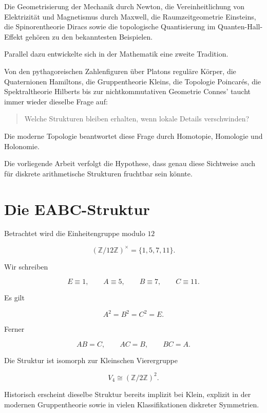 \documentclass[11pt,a4paper]{article}
\begin{document}
	Die Geometrisierung der Mechanik durch Newton,
	die Vereinheitlichung von Elektrizität und Magnetismus
	durch Maxwell,
	die Raumzeitgeometrie Einsteins,
	die Spinorentheorie Diracs
	sowie die topologische Quantisierung
	im Quanten-Hall-Effekt
	gehören zu den bekanntesten Beispielen.
	
	Parallel dazu entwickelte sich in der Mathematik
	eine zweite Tradition.
	
	Von den pythagoreischen Zahlenfiguren
	über Platons reguläre Körper,
	die Quaternionen Hamiltons,
	die Gruppentheorie Kleins,
	die Topologie Poincarés,
	die Spektraltheorie Hilberts
	bis zur nichtkommutativen Geometrie Connes'
	taucht immer wieder dieselbe Frage auf:
	
	\begin{quote}
		Welche Strukturen bleiben erhalten,
		wenn lokale Details verschwinden?
	\end{quote}
	
	Die moderne Topologie beantwortet diese Frage
	durch Homotopie, Homologie und Holonomie.
	
	Die vorliegende Arbeit verfolgt die Hypothese,
	dass genau diese Sichtweise
	auch für diskrete arithmetische Strukturen fruchtbar sein könnte.
	
	\section{Die EABC-Struktur}
	
	Betrachtet wird die Einheitengruppe modulo $12$
	
	\[
	(\mathbb Z/12\mathbb Z)^\times
	=
	\{1,5,7,11\}.
	\]
	
	Wir schreiben
	
	\[
	E\equiv1,
	\qquad
	A\equiv5,
	\qquad
	B\equiv7,
	\qquad
	C\equiv11.
	\]
	
	Es gilt
	
	\[
	A^2=B^2=C^2=E.
	\]
	
	Ferner
	
	\[
	AB=C,
	\qquad
	AC=B,
	\qquad
	BC=A.
	\]
	
	Die Struktur ist isomorph zur Kleinschen Vierergruppe
	
	\[
	V_4
	\cong
	(\mathbb Z/2\mathbb Z)^2.
	\]
	
	Historisch erscheint dieselbe Struktur
	bereits implizit bei Klein,
	explizit in der modernen Gruppentheorie
	sowie in vielen Klassifikationen diskreter Symmetrien.
	
\end{document}
